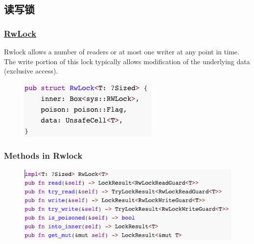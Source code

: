 \subsection{读写锁} %
\begin{frame}[fragile]
    \frametitle{\href{https://doc.rust-lang.org/std/sync/struct.RwLock.html}{RwLock}}

Rwlock allows a number of readers or at most one writer at any point in time. The write portion of this lock typically allows modification of the underlying data (exclusive access). \pause

    \begin{figure}
    \includegraphics[width=0.5\linewidth]{figs/struct-rwlock.png}
    \end{figure}

\end{frame}
% 
% 
% 
% 
\begin{frame}[fragile]
    \frametitle{Methods in Rwlock}
    \begin{figure}
    \includegraphics[width=1.0\linewidth]{figs/methods-rwlock.png}
    \end{figure}

\end{frame}
